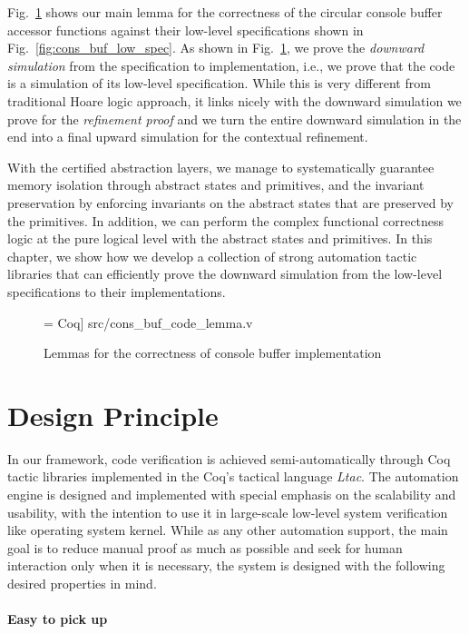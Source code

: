 Fig.~\ref{fig:cons_buf_code_lemma} shows our main lemma for the correctness of
the circular console buffer accessor functions against their low-level specifications
shown in Fig.~\ref{fig:cons_buf_low_spec}. As shown in Fig.~\ref{fig:cons_buf_code_lemma},
we prove the {\it downward simulation} from the specification to implementation, i.e.,
we prove that the code is a simulation of its low-level specification.
While this is very different from traditional Hoare logic approach, it links
nicely with the downward simulation we prove for the {\it refinement proof}
and we turn the entire downward simulation in the end into a final upward simulation
for the contextual refinement. 

With the certified abstraction layers, we manage to systematically guarantee
memory isolation through abstract states and primitives, and the invariant preservation
by enforcing invariants on the abstract states that are preserved by the primitives.
In addition, we can perform the complex functional correctness logic at the
pure logical level with the abstract states and primitives.
In this chapter, we show how we develop a collection of strong automation tactic
libraries that can efficiently prove the downward simulation from the low-level
specifications to their implementations.

\begin{figure}
 = Coq] {src/cons_buf_code_lemma.v}
\caption{Lemmas for the correctness of console buffer implementation}
\label{fig:cons_buf_code_lemma}
\end{figure}

\section{Design Principle}
\label{sec:principle}

In our framework,
code verification is achieved semi-automatically through Coq tactic libraries
implemented in the Coq's tactical language \emph{Ltac}. 
The automation engine is designed and implemented with special emphasis on
the scalability and usability, with the intention to use it in large-scale
low-level system verification like operating system kernel.
While as any other automation support, the main goal is to reduce manual proof as much as
possible and seek for human interaction only when it is necessary,
the system is designed with the following desired properties in mind.

\paragraph{Easy to pick up}

